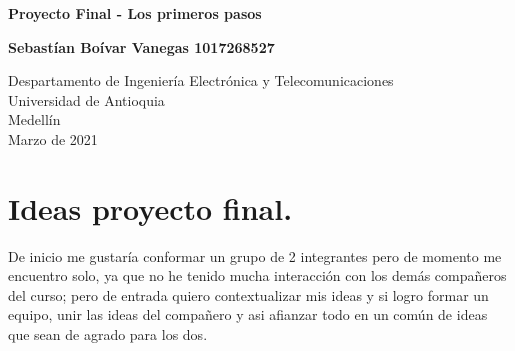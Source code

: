 \documentclass{article}
\begin{document}
\begin{titlepage}
    \begin{center}
        \vspace*{1cm}
            
        \Huge
        \textbf{Proyecto Final - Los primeros pasos}
            
        \vspace{0.5cm}
        \LARGE
        
            
        \vspace{1.5cm}
            
        \textbf{Sebastían Boívar Vanegas 1017268527}
            
        \vfill
            
        \vspace{0.8cm}
            
        \Large
        Despartamento de Ingeniería Electrónica y Telecomunicaciones\\
        Universidad de Antioquia\\
        Medellín\\
        Marzo de 2021
            
    \end{center}
\end{titlepage}

\tableofcontents
\newpage
\section{Ideas proyecto final.}\label{intro}
De inicio me gustaría conformar un grupo de 2 integrantes pero de momento me encuentro solo, ya que no he tenido mucha interacción con los demás compañeros del curso; pero de entrada quiero contextualizar mis ideas y si logro formar un equipo, unir las ideas del compañero y asi afianzar todo en un común de ideas que sean de agrado para los dos.\\
\end{document}
